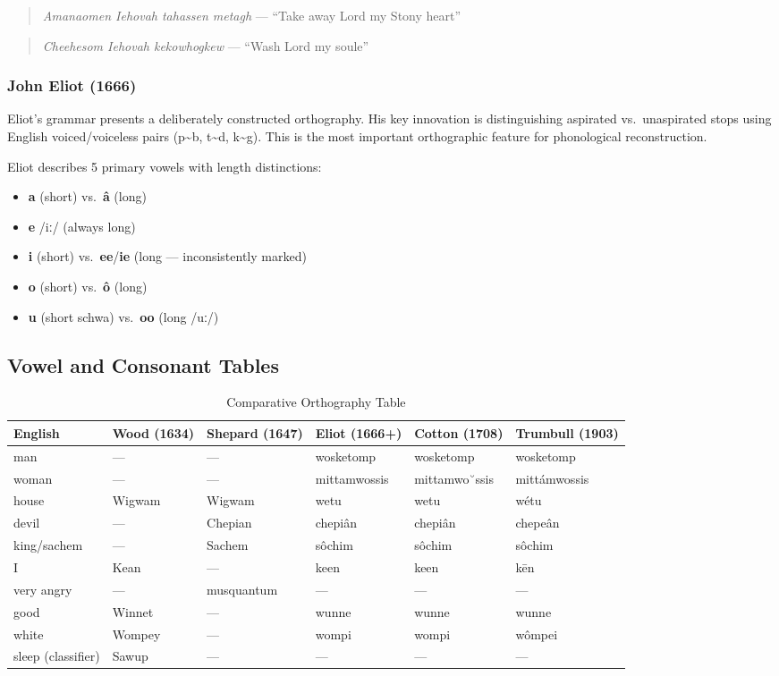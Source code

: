 \begin{quote}
  \emph{Amanaomen Iehovah tahassen metagh} --- ``Take away Lord my Stony heart''
\end{quote}

\begin{quote}
  \emph{Cheehesom Iehovah kekowhogkew} --- ``Wash Lord my soule''
\end{quote}

\subsubsection{John Eliot (1666)}

Eliot's grammar presents a deliberately constructed orthography. His key
innovation is distinguishing aspirated vs.\ unaspirated stops using English
voiced/voiceless pairs (p\textasciitilde b, t\textasciitilde d,
k\textasciitilde g). This is the most important orthographic feature for
phonological reconstruction.

Eliot describes 5 primary vowels with length distinctions:
\begin{itemize}
  \item \textbf{a} (short) vs.\ \textbf{â} (long)
  \item \textbf{e} /iː/ (always long)
  \item \textbf{i} (short) vs.\ \textbf{ee}/\textbf{ie} (long --- inconsistently
    marked)
  \item \textbf{o} (short) vs.\ \textbf{ô} (long)
  \item \textbf{u} (short schwa) vs.\ \textbf{oo} (long /uː/)
\end{itemize}

\subsection{Vowel and Consonant Tables}

\begin{table}[htbp]
\centering
\caption{Comparative Orthography Table}
\label{tab:1365-compare}
\begin{tabular}{llllll}
\hline
English & Wood (1634) & Shepard (1647) & Eliot (1666+) & Cotton (1708) & Trumbull (1903) \\
\hline
man & --- & --- & wosketomp & wosketomp & wosketomp \\
woman & --- & --- & mittamwossis & mittamwo˘ssis & mittámwossis \\
house & Wigwam & Wigwam & wetu & wetu & wétu \\
devil & --- & Chepian & chepiân & chepiân & chepeân \\
king/sachem & --- & Sachem & sôchim & sôchim & sôchim \\
I & Kean & --- & keen & keen & kēn \\
very angry & --- & musquantum & --- & --- & --- \\
good & Winnet & --- & wunne & wunne & wunne \\
white & Wompey & --- & wompi & wompi & wômpei \\
sleep (classifier) & Sawup & --- & --- & --- & --- \\
\hline
\end{tabular}
\end{table}

